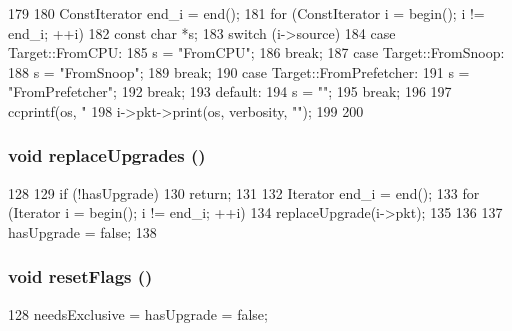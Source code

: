 \begin{DoxyCode}
179 {
180     ConstIterator end_i = end();
181     for (ConstIterator i = begin(); i != end_i; ++i) {
182         const char *s;
183         switch (i->source) {
184           case Target::FromCPU:
185             s = "FromCPU";
186             break;
187           case Target::FromSnoop:
188             s = "FromSnoop";
189             break;
190           case Target::FromPrefetcher:
191             s = "FromPrefetcher";
192             break;
193           default:
194             s = "";
195             break;
196         }
197         ccprintf(os, "%
198         i->pkt->print(os, verbosity, "");
199     }
200 }
\end{DoxyCode}
\hypertarget{classMSHR_1_1TargetList_a98242f31aa34a435ca066c5e35413a2c}{
\subsubsection[{replaceUpgrades}]{\setlength{\rightskip}{0pt plus 5cm}void replaceUpgrades ()}}
\label{classMSHR_1_1TargetList_a98242f31aa34a435ca066c5e35413a2c}



\begin{DoxyCode}
128 {
129     if (!hasUpgrade)
130         return;
131 
132     Iterator end_i = end();
133     for (Iterator i = begin(); i != end_i; ++i) {
134         replaceUpgrade(i->pkt);
135     }
136 
137     hasUpgrade = false;
138 }
\end{DoxyCode}
\hypertarget{classMSHR_1_1TargetList_a62735a8af8d77cbab59807d09d9d57df}{
\subsubsection[{resetFlags}]{\setlength{\rightskip}{0pt plus 5cm}void resetFlags ()}}
\label{classMSHR_1_1TargetList_a62735a8af8d77cbab59807d09d9d57df}



\begin{DoxyCode}
128 { needsExclusive = hasUpgrade = false; }
\end{DoxyCode}


